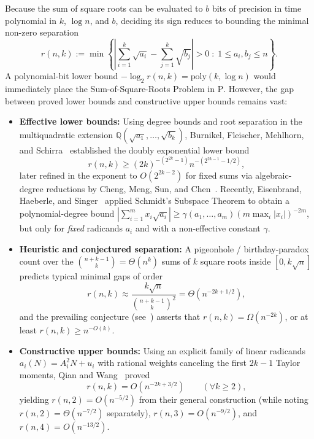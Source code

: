 \documentclass[11pt,a4paper]{article}
\theoremstyle{definition}
\theoremstyle{remark}
\newcommand{\QQ}{\mathbb{Q}}
\begin{document}
Because the sum of square roots can be evaluated to $b$ bits of precision in time polynomial in $k$, $\log n$, and $b$, deciding its sign reduces to bounding the minimal non-zero separation
\begin{equation}
\label{eq:def-rnk}
r(n, k) := \min \left\{ \left| \sum_{i=1}^k \sqrt{a_i} - \sum_{j=1}^k \sqrt{b_j} \right| > 0 \;:\; 1 \le a_i, b_j \le n \right\}.
\end{equation}
A polynomial-bit lower bound $-\log_2 r(n, k) = \mathrm{poly}(k, \log n)$ would immediately place the Sum-of-Square-Roots Problem in $\mathrm{P}$. However, the gap between proved lower bounds and constructive upper bounds remains vast:
\begin{itemize}
\item \textbf{Effective lower bounds:} Using degree bounds and root separation in the multiquadratic extension $\QQ(\sqrt{a_1}, \dots, \sqrt{b_k})$, Burnikel, Fleischer, Mehlhorn, and Schirra~\cite{BFMS2000} established the doubly exponential lower bound
\[
r(n, k) \ge (2k)^{-(2^{2k} - 1)} n^{-(2^{2k - 1} - 1/2)},
\]
later refined in the exponent to $O(2^{2k - 2})$ for fixed sums via algebraic-degree reductions by Cheng, Meng, Sun, and Chen~\cite{Cheng2010}. Recently, Eisenbrand, Haeberle, and Singer~\cite{EHS2024} applied Schmidt's Subspace Theorem to obtain a polynomial-degree bound $|\sum_{i=1}^m x_i \sqrt{a_i}| \ge \gamma(a_1, \dots, a_m) (m \max_i |x_i|)^{-2m}$, but only for \emph{fixed} radicands $a_i$ and with a non-effective constant $\gamma$.
\item \textbf{Heuristic and conjectured separation:} A pigeonhole / birthday-paradox count over the $\binom{n + k - 1}{k} = \Theta(n^k)$ sums of $k$ square roots inside $[0, k\sqrt{n}]$ predicts typical minimal gaps of order
\[
r(n, k) \approx \frac{k \sqrt{n}}{\binom{n + k - 1}{k}^2} = \Theta\!\left(n^{-2k + 1/2}\right),
\]
and the prevailing conjecture (see~\cite{TOPP33,QianWang2006}) asserts that $r(n, k) = \Omega(n^{-2k})$, or at least $r(n, k) \ge n^{-O(k)}$.
\item \textbf{Constructive upper bounds:} Using an explicit family of linear radicands $a_i(N) = A_i^2 N + u_i$ with rational weights canceling the first $2k - 1$ Taylor moments, Qian and Wang~\cite{QianWang2006} proved
\[
r(n, k) = O\!\left(n^{-2k + 3/2}\right) \qquad (\forall k \ge 2),
\]
yielding $r(n, 2) = O(n^{-5/2})$ from their general construction (while noting $r(n, 2) = \Theta(n^{-7/2})$ separately), $r(n, 3) = O(n^{-9/2})$, and $r(n, 4) = O(n^{-13/2})$.
\end{itemize}
\end{document}
